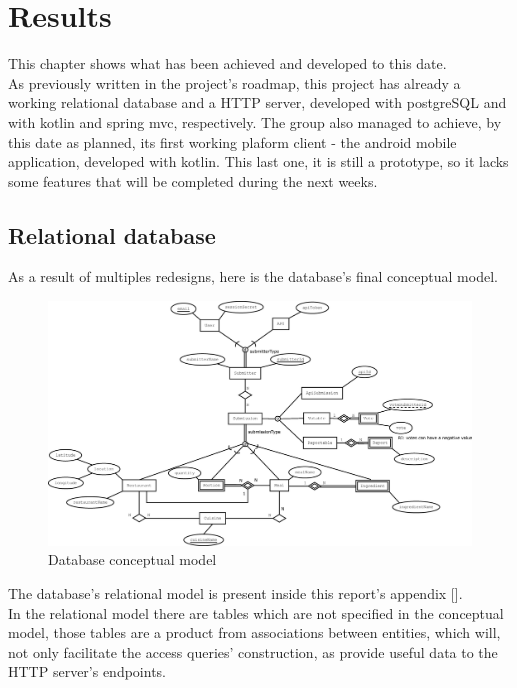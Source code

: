 %
%
\chapter{Results}

This chapter shows what has been achieved and developed to this date.\\

As previously written in the project's roadmap, this project has already a working relational database
and a HTTP server, developed with postgreSQL and with kotlin and spring mvc, respectively. The group also
managed to achieve, by this date as planned, its first working plaform client - the android mobile application, developed
with kotlin. This last one, it is still a prototype, so it lacks some features that will be completed during the next weeks.

\section{Relational database}

As a result of multiples redesigns, here is the database's final conceptual model.

\begin{figure}[H]    
    \includegraphics[scale=0.25]{_figures/Nutr.io_Database_Diagram.eps}
    \caption{Database conceptual model}
\end{figure}

\newpage
The database's relational model is present inside this report's appendix [].\\

In the relational model there are tables which are not specified in the conceptual model,
those tables are a product from associations between entities, which will, not only facilitate the access queries' construction,
as provide useful data to the HTTP server's endpoints.\\

